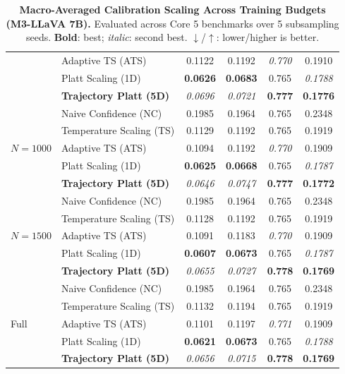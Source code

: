 \begin{table}[t]
\begin{tabular}{llcccc}
 & Adaptive TS (ATS) & 0.1122 & 0.1192 & \textit{0.770} & 0.1910 \\
 & Platt Scaling (1D) & \textbf{0.0626} & \textbf{0.0683} & 0.765 & \textit{0.1788} \\
 & \textbf{Trajectory Platt (5D)} & \textit{0.0696} & \textit{0.0721} & \textbf{0.777} & \textbf{0.1776} \\
\midrule
\multirow{5}{*}{$N = 1000$} & Naive Confidence (NC) & 0.1985 & 0.1964 & 0.765 & 0.2348 \\
 & Temperature Scaling (TS) & 0.1129 & 0.1192 & 0.765 & 0.1919 \\
 & Adaptive TS (ATS) & 0.1094 & 0.1192 & \textit{0.770} & 0.1909 \\
 & Platt Scaling (1D) & \textbf{0.0625} & \textbf{0.0668} & 0.765 & \textit{0.1787} \\
 & \textbf{Trajectory Platt (5D)} & \textit{0.0646} & \textit{0.0747} & \textbf{0.777} & \textbf{0.1772} \\
\midrule
\multirow{5}{*}{$N = 1500$} & Naive Confidence (NC) & 0.1985 & 0.1964 & 0.765 & 0.2348 \\
 & Temperature Scaling (TS) & 0.1128 & 0.1192 & 0.765 & 0.1919 \\
 & Adaptive TS (ATS) & 0.1091 & 0.1183 & \textit{0.770} & 0.1909 \\
 & Platt Scaling (1D) & \textbf{0.0607} & \textbf{0.0673} & 0.765 & \textit{0.1787} \\
 & \textbf{Trajectory Platt (5D)} & \textit{0.0655} & \textit{0.0727} & \textbf{0.778} & \textbf{0.1769} \\
\midrule
\multirow{5}{*}{Full} & Naive Confidence (NC) & 0.1985 & 0.1964 & 0.765 & 0.2348 \\
 & Temperature Scaling (TS) & 0.1132 & 0.1194 & 0.765 & 0.1919 \\
 & Adaptive TS (ATS) & 0.1101 & 0.1197 & \textit{0.771} & 0.1909 \\
 & Platt Scaling (1D) & \textbf{0.0621} & \textbf{0.0673} & 0.765 & \textit{0.1788} \\
 & \textbf{Trajectory Platt (5D)} & \textit{0.0656} & \textit{0.0715} & \textbf{0.778} & \textbf{0.1769} \\
\bottomrule
\end{tabular}
\caption{\textbf{Macro-Averaged Calibration Scaling Across Training Budgets (M3-LLaVA 7B).} Evaluated across Core 5 benchmarks over 5 subsampling seeds. \textbf{Bold}: best; \textit{italic}: second best. $\downarrow$/$\uparrow$: lower/higher is better.}
\label{tab:sample_efficiency_macro_m3_full}
\end{table}

